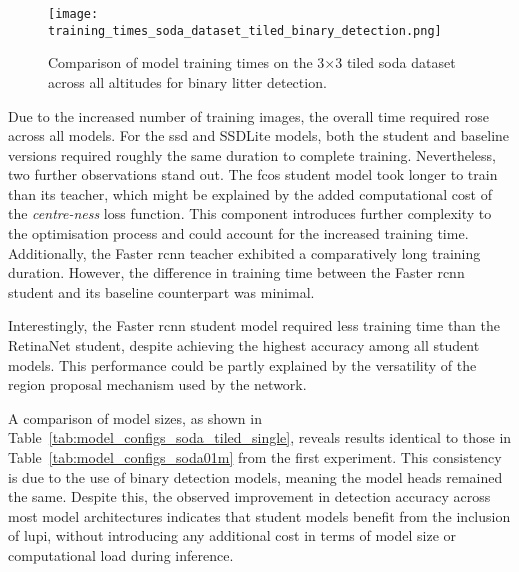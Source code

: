 \begin{figure}[!ht]
    \centering
    \texttt{[image: training\_times\_soda\_dataset\_tiled\_binary\_detection.png]}
    \caption{Comparison of model training times on the 3$\times$3 tiled \gls{soda} dataset across all altitudes for binary litter detection.}
    \label{fig:soda_tiled_single_training_time}
\end{figure}

Due to the increased number of training images, the overall time required rose across all models. For the \gls{ssd} and SSDLite models, both the student and baseline versions required roughly the same duration to complete training. Nevertheless, two further observations stand out. The \gls{fcos} student model took longer to train than its teacher, which might be explained by the added computational cost of the \textit{centre-ness} loss function. This component introduces further complexity to the optimisation process and could account for the increased training time. Additionally, the Faster \gls{rcnn} teacher exhibited a comparatively long training duration. However, the difference in training time between the Faster \gls{rcnn} student and its baseline counterpart was minimal.

Interestingly, the Faster \gls{rcnn} student model required less training time than the RetinaNet student, despite achieving the highest accuracy among all student models. This performance could be partly explained by the versatility of the region proposal mechanism used by the network.

A comparison of model sizes, as shown in Table~\ref{tab:model_configs_soda_tiled_single}, reveals results identical to those in Table~\ref{tab:model_configs_soda01m} from the first experiment. This consistency is due to the use of binary detection models, meaning the model heads remained the same. Despite this, the observed improvement in detection accuracy across most model architectures indicates that student models benefit from the inclusion of \gls{lupi}, without introducing any additional cost in terms of model size or computational load during inference.

